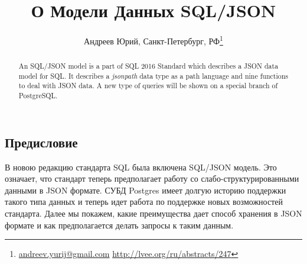 \documentclass[10pt, a5paper]{article}
\begin{document}
\title{О Модели Данных SQL/JSON}
\author{Андреев Юрий, Санкт-Петербург, РФ\footnote{\url{andreev.yurij@gmail.com} \url{http://lvee.org/ru/abstracts/247}}}
\maketitle
\begin{abstract}
An SQL/JSON model is a part of SQL 2016 Standard\cite{AY1} which describes a JSON data model for SQL.
It describes a \textit{jsonpath} data type as a path language and nine functions to deal with JSON data.
A new type of queries will be shown on a special branch of PostgreSQL.
\end{abstract}

\subsection*{Предисловие}
В новою редакцию стандарта SQL\cite{AY1} была включена SQL/JSON модель.
Это означает, что стандарт теперь предполагает работу со слабо-структурированными
данными в JSON формате\cite{AY2}. СУБД Postgres имеет долгую историю поддержки такого типа данных
и теперь идет работа по поддержке новых возможностей стандарта.
Далее мы покажем, какие преимущества дает способ хранения в JSON формате и как 
предполагается делать запросы к таким данным.
\end{document}
